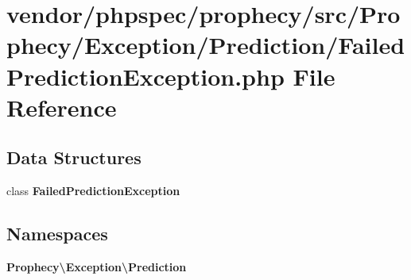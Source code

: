 \section{vendor/phpspec/prophecy/src/\+Prophecy/\+Exception/\+Prediction/\+Failed\+Prediction\+Exception.php File Reference}
\label{_failed_prediction_exception_8php}
\subsection*{Data Structures}
\begin{DoxyCompactItemize}
\item 
class {\bf Failed\+Prediction\+Exception}
\end{DoxyCompactItemize}
\subsection*{Namespaces}
\begin{DoxyCompactItemize}
\item 
 {\bf Prophecy\textbackslash{}\+Exception\textbackslash{}\+Prediction}
\end{DoxyCompactItemize}
